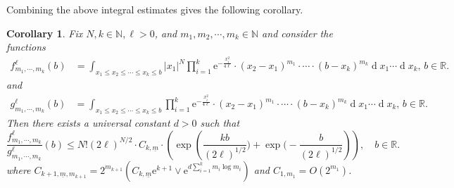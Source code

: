 \documentclass[11pt, reqno]{amsart}
\numberwithin{equation}{section}
\newcounter{dummy} \numberwithin{dummy}{section}
\newtheorem{corollary}[dummy]{Corollary}
\newcommand{\N}{\ensuremath{\mathbb{N}}}
\newcommand{\R}{\ensuremath{\mathbb{R}}}
\newcommand{\diff}{\ensuremath{\operatorname{d}\!}}
\begin{document}
Combining the above integral estimates gives the following corollary.

\begin{corollary}\label{cor: explicit constants good bound}
 Fix $N,k\in \N, \ell> 0$, and $m_1, m_2, \cdots, m_k \in \N$ and consider the functions
    \begin{equation*}
        \begin{array}{rr}
            f^\ell_{m_1, \cdots, m_k}(b) &= \displaystyle\int_{x_1\le x_2\le \cdots\le x_k\le b}|x_1|^N\prod_{i=1}^{k}\mathrm{e}^{-\frac{x_i^2}{4\ell}}\cdot(x_2-x_1)^{m_1}\cdot \cdots \cdot (b-x_k)^{m_k}\diff x_1\cdots \diff x_{k},\, b\in \R.
        \end{array}
    \end{equation*}
    and 
    \begin{equation*}
        \begin{array}{rr}
            g^{\ell}_{m_1, \cdots, m_k}(b) &= \displaystyle\int_{x_1\le x_2\le \cdots\le x_k\le b}\prod_{i=1}^{k}\mathrm{e}^{-\frac{x_i^2}{4\ell}}\cdot(x_2-x_1)^{m_1}\cdot \cdots \cdot (b-x_k)^{m_k}\diff x_1\cdots \diff x_{k},\, b\in \R.
        \end{array}
    \end{equation*}
    Then there exists a universal constant $d>0$ such that 
    \[
     \frac{f^{\ell}_{m_1, \cdots, m_k}}{g^{\ell}_{m_1, \cdots, m_k}}(b) \le  N!(2\ell)^{N/2} \cdot C_{k,\underline{m}} \cdot \left( \exp\left(\frac{kb}{(2\ell)^{1/2}}\big)+\exp\big(-\frac{b}{(2\ell)^{1/2}}\right)\right), \quad b\in \R.
    \]
    where $C_{k+1, \underline{m},m_{k+1}} = 2^{m_{k+1}}(C_{k,\underline{m}}\mathrm{e}^{k+1}\lor \mathrm{e}^{d\sum_{i=1}^k m_i\log m_i})$ and $C_{1, m_1} = O(2^{m_1})$.
\end{corollary}
\end{document}
